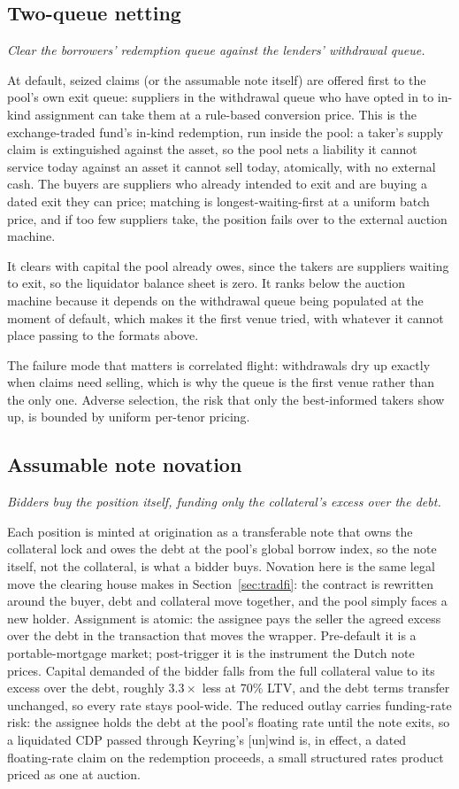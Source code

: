 \documentclass[11pt,a4paper]{article}
\newcommand{\model}[2]{\subsection{#1}\noindent\textit{#2}\medskip}
\begin{document}
\model{Two-queue netting}{Clear the borrowers' redemption queue against the lenders' withdrawal queue.}

At default, seized claims (or the assumable note itself) are offered first to the pool's own exit queue: suppliers in the withdrawal queue who have opted in to in-kind assignment can take them at a rule-based conversion price. This is the exchange-traded fund's in-kind redemption, run inside the pool: a taker's supply claim is extinguished against the asset, so the pool nets a liability it cannot service today against an asset it cannot sell today, atomically, with no external cash. The buyers are suppliers who already intended to exit and are buying a dated exit they can price; matching is longest-waiting-first at a uniform batch price, and if too few suppliers take, the position fails over to the external auction machine.

It clears with capital the pool already owes, since the takers are suppliers waiting to exit, so the liquidator balance sheet is zero. It ranks below the auction machine because it depends on the withdrawal queue being populated at the moment of default, which makes it the first venue tried, with whatever it cannot place passing to the formats above.

The failure mode that matters is correlated flight: withdrawals dry up exactly when claims need selling, which is why the queue is the first venue rather than the only one. Adverse selection, the risk that only the best-informed takers show up, is bounded by uniform per-tenor pricing.

\model{Assumable note novation}{Bidders buy the position itself, funding only the collateral's excess over the debt.}

Each position is minted at origination as a transferable note that owns the collateral lock and owes the debt at the pool's global borrow index, so the note itself, not the collateral, is what a bidder buys. Novation here is the same legal move the clearing house makes in Section~\ref{sec:tradfi}: the contract is rewritten around the buyer, debt and collateral move together, and the pool simply faces a new holder. Assignment is atomic: the assignee pays the seller the agreed excess over the debt in the transaction that moves the wrapper. Pre-default it is a portable-mortgage market; post-trigger it is the instrument the Dutch note prices. Capital demanded of the bidder falls from the full collateral value to its excess over the debt, roughly $3.3\times$ less at 70\% LTV, and the debt terms transfer unchanged, so every rate stays pool-wide. The reduced outlay carries funding-rate risk: the assignee holds the debt at the pool's floating rate until the note exits, so a liquidated CDP passed through Keyring's [un]wind is, in effect, a dated floating-rate claim on the redemption proceeds, a small structured rates product priced as one at auction.
\end{document}
